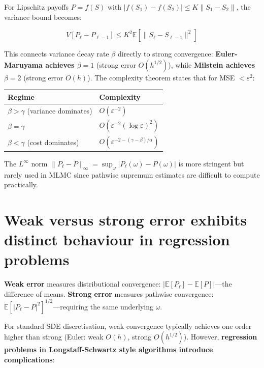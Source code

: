 \documentclass[11pt,a4paper]{article}
\begin{document}
\noindent For Lipschitz payoffs $P = f(S)$ with $|f(S_1) - f(S_2)| \leq K\|S_1 - S_2\|$, the variance bound becomes:

\begin{equation}
V[P_\ell - P_{\ell-1}] \leq K^2 \mathbb{E}[\|S_\ell - S_{\ell-1}\|^2]
\end{equation}

\noindent This connects variance decay rate $\beta$ directly to strong convergence: \textbf{Euler-Maruyama achieves $\beta = 1$} (strong error $O(h^{1/2})$), while \textbf{Milstein achieves $\beta = 2$} (strong error $O(h)$). The complexity theorem states that for MSE $< \varepsilon^2$:

\vspace{0.3cm}

\begin{center}
\begin{tabular}{@{}ll@{}}
\toprule
\textbf{Regime} & \textbf{Complexity} \\
\midrule
$\beta > \gamma$ (variance dominates) & $O(\varepsilon^{-2})$ \\
$\beta = \gamma$ & $O(\varepsilon^{-2}(\log\varepsilon)^2)$ \\
$\beta < \gamma$ (cost dominates) & $O(\varepsilon^{-2-(\gamma-\beta)/\alpha})$ \\
\bottomrule
\end{tabular}
\end{center}

\vspace{0.3cm}

\noindent The $L^\infty$ norm $\|P_\ell - P\|_\infty = \sup_\omega |P_\ell(\omega) - P(\omega)|$ is more stringent but rarely used in MLMC since pathwise supremum estimates are difficult to compute practically.

\section{Weak versus strong error exhibits distinct behaviour in regression problems}

\textbf{Weak error} measures distributional convergence: $|\mathbb{E}[P_\ell] - \mathbb{E}[P]|$---the difference of means. \textbf{Strong error} measures pathwise convergence: $\mathbb{E}[|P_\ell - P|^2]^{1/2}$---requiring the same underlying $\omega$.

\vspace{0.2cm}

\noindent For standard SDE discretisation, weak convergence typically achieves one order higher than strong (Euler: weak $O(h)$, strong $O(h^{1/2})$). However, \textbf{regression problems in Longstaff-Schwartz style algorithms introduce complications}:
\end{document}
